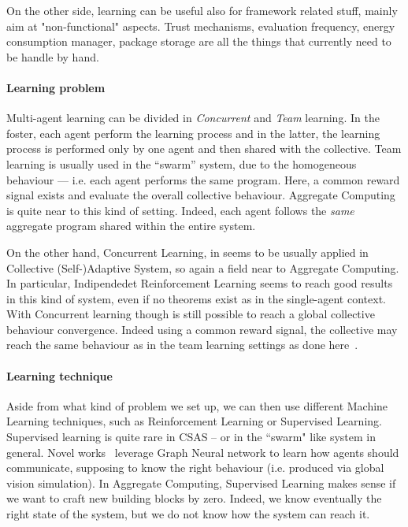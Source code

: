 \documentclass[conference]{IEEEtran}
\begin{document}
On the other side, learning can be useful also for framework related stuff,
 mainly aim at "non-functional" aspects. 
 Trust mechanisms, evaluation frequency, energy consumption manager, package storage are all the things that currently need to be handle by hand.
 
\paragraph{Learning problem} 
Multi-agent learning can be divided in \textit{Concurrent} and \textit{Team} learning. 
In the foster, each agent perform the learning process and in the latter,
 the learning process is performed only by one agent and then shared with the collective.
% 
Team learning is usually used in the ``swarm'' system, due to the homogeneous behaviour 
 --- i.e. each agent performs the same program. 
 Here, a common reward signal exists and evaluate the overall collective behaviour.
 Aggregate Computing is quite near to this kind of setting.
% 
Indeed, each agent follows the \textit{same} aggregate program shared within the entire system.

On the other hand, Concurrent Learning, in \cite{csas-and-marl} seems to be usually applied in Collective
 (Self-)Adaptive System, so again a field near to Aggregate Computing. 
 In particular, Indipendedet Reinforcement Learning seems to reach good results in this kind of system, 
 even if no theorems exist as in the single-agent context.
%
With Concurrent learning though is still possible to reach a global collective behaviour convergence. 
 Indeed using a common reward signal, the collective may reach the same behaviour as in the team learning settings as done here~\cite{iima2008swarm}.

\paragraph{Learning technique}
Aside from what kind of problem we set up, we can then use different Machine Learning techniques,
 such as Reinforcement Learning or Supervised Learning.
%
Supervised learning is quite rare in CSAS -- or in the ``swarm" like system in general.
%
Novel works~\cite{DBLP:conf/corl/TolstayaGPP0R19} leverage Graph Neural network to learn how agents should communicate, supposing to know the right behaviour (i.e. produced via global vision simulation).
%
In Aggregate Computing, Supervised Learning makes sense if we want to craft new building blocks by zero. 
% 
Indeed, we know eventually the right state of the system, but we do not know how the system can reach it.
\end{document}
